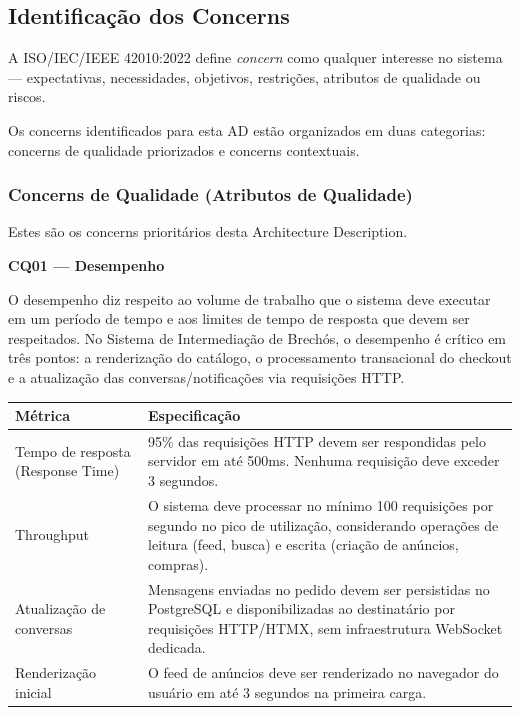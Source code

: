 \documentclass[12pt, a4paper]{article}
\begin{document}
\subsection{Identificação dos Concerns}

A ISO/IEC/IEEE 42010:2022 define \textit{concern} como qualquer interesse no sistema --- expectativas, necessidades, objetivos, restrições, atributos de qualidade ou riscos.

Os concerns identificados para esta AD estão organizados em duas categorias: concerns de qualidade priorizados e concerns contextuais.

\subsubsection{Concerns de Qualidade (Atributos de Qualidade)}

Estes são os concerns prioritários desta Architecture Description.

\vspace{0.5cm}

\noindent\textbf{CQ01 --- Desempenho}

O desempenho diz respeito ao volume de trabalho que o sistema deve executar em um período de tempo e aos limites de tempo de resposta que devem ser respeitados. No Sistema de Intermediação de Brechós, o desempenho é crítico em três pontos: a renderização do catálogo, o processamento transacional do checkout e a atualização das conversas/notificações via requisições HTTP.

\begin{longtable}{|p{4.5cm}|p{10cm}|}
\hline
\textbf{Métrica} & \textbf{Especificação} \\
\hline
Tempo de resposta (Response Time) & 95\% das requisições HTTP devem ser respondidas pelo servidor em até 500ms. Nenhuma requisição deve exceder 3 segundos. \\
\hline
Throughput & O sistema deve processar no mínimo 100 requisições por segundo no pico de utilização, considerando operações de leitura (feed, busca) e escrita (criação de anúncios, compras). \\
\hline
Atualização de conversas & Mensagens enviadas no pedido devem ser persistidas no PostgreSQL e disponibilizadas ao destinatário por requisições HTTP/HTMX, sem infraestrutura WebSocket dedicada. \\
\hline
Renderização inicial & O feed de anúncios deve ser renderizado no navegador do usuário em até 3 segundos na primeira carga. \\
\hline
\end{longtable}
\end{document}
